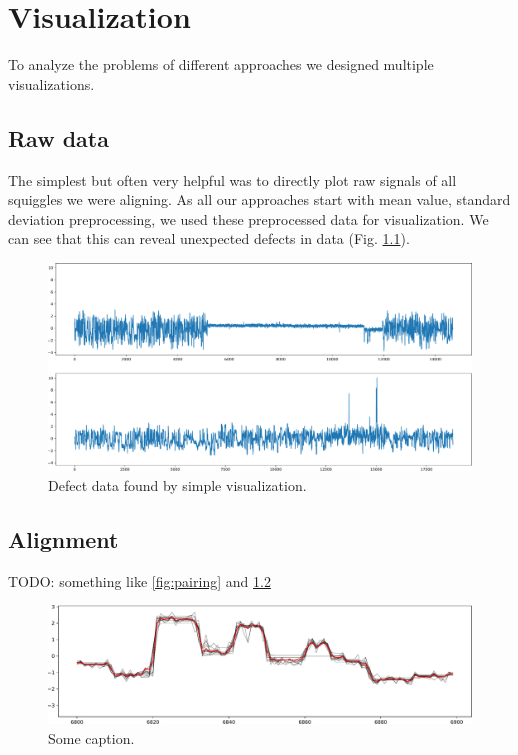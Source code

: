 \chapter{Visualization}

\label{kap:visualization} %

To analyze the problems of different approaches we designed multiple visualizations.

\section{Raw data}

The simplest but often very helpful was to directly plot raw signals of all squiggles we were aligning. As all our approaches start with mean value, standard deviation preprocessing, 
we used these preprocessed data for visualization. We can see that this can reveal unexpected defects in data (Fig. \ref{fig:signals}). 

\begin{figure}[h]
  \centering
  \includegraphics[width=1.0\textwidth]{images/signals}
  \caption{Defect data found by simple visualization.}
  \label{fig:signals}
\end{figure}

\section{Alignment}
TODO: something like \ref{fig:pairing} and \ref{fig:foos}

\begin{figure}[h]
  \centering
  \includegraphics[width=1.0\textwidth]{images/foos}
  \caption{Some caption.}
  \label{fig:foos}
\end{figure}